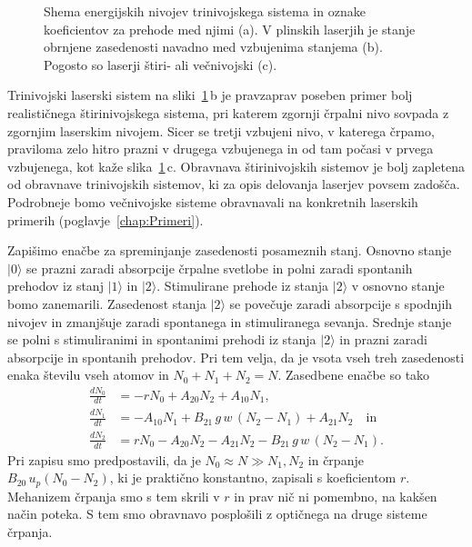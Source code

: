 \begin{figure}[h]
\centering
\def\svgwidth{130truemm} 

\caption{Shema energijskih nivojev trinivojskega sistema in oznake koeficientov za prehode
med njimi (a). V plinskih laserjih je stanje obrnjene zasedenosti navadno med vzbujenima 
stanjema (b). Pogosto so laserji štiri- ali večnivojski (c).}
\label{fig:3nivojski}
\end{figure}
\begin{remark}
Trinivojski laserski sistem na sliki~\ref{fig:3nivojski}\,b je pravzaprav 
poseben primer bolj realističnega štiri\-nivojskega sistema, 
pri katerem zgornji črpalni nivo sovpada z zgornjim laserskim nivojem. Sicer se tretji vzbujeni nivo, 
v katerega črpamo, praviloma zelo hitro prazni v drugega vzbujenega in od tam počasi v prvega vzbujenega, 
kot kaže slika~\ref{fig:3nivojski}\,c.
Obravnava štirinivojskih sistemov je bolj zapletena od obravnave trinivojskih sistemov, 
ki za opis delovanja laserjev povsem zadošča. Podrobneje bomo večnivojske sisteme 
obravnavali na konkretnih laserskih primerih (poglavje~\ref{chap:Primeri}).
\end{remark}

Zapišimo enačbe za spreminjanje zasedenosti posameznih stanj. Osnovno stanje
$|0\rangle$ se prazni zaradi absorpcije črpalne svetlobe in polni zaradi
spontanih prehodov iz stanj $|1\rangle$ in $|2\rangle$. Stimulirane
prehode iz stanja $|2\rangle$ v osnovno stanje bomo zanemarili. Zasedenost stanja $|2\rangle$ se
povečuje zaradi absorpcije s spodnjih nivojev in zmanjšuje
zaradi spontanega in stimuliranega sevanja. Srednje stanje se polni
s stimuliranimi in spontanimi prehodi iz stanja $|2\rangle$ in prazni
zaradi absorpcije in spontanih prehodov.
Pri tem velja, da je vsota vseh treh zasedenosti enaka številu vseh atomov in $N_{0}+N_{1}+N_{2}=N$. 
Zasedbene enačbe so tako
\begin{align}
\frac{dN_{0}}{dt} & =  -rN_0+A_{20}N_{2}+A_{10}N_{1}, \label{4.39.1}\\
\frac{dN_{1}}{dt} & =  -A_{10}N_{1}+B_{21}\,g\,w\, (N_{2}-N_{1})+A_{21}N_{2} \label{4.39.2} \quad \mathrm{in}\\
\frac{dN_{2}}{dt} & =  rN_0-A_{20}N_{2}-A_{21}N_{2}-B_{21}\,g\,w\, (N_2-N_1).
\label{4.39}
\end{align}
Pri zapisu smo predpostavili, da je $N_0 \approx N \gg N_1, N_2$ in črpanje $B_{20}\, 
u_{p} (N_0-N_2)$, ki je praktično konstantno, zapisali s koeficientom $r$. Mehanizem črpanja 
smo s tem skrili v $r$ in prav nič ni pomembno, na kakšen način poteka.
S tem smo obravnavo posplošili z optičnega na druge sisteme črpanja. 

